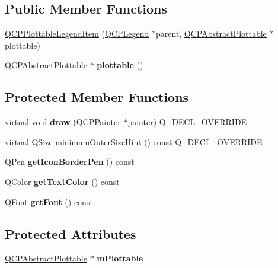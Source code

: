 \subsection*{Public Member Functions}
\begin{DoxyCompactItemize}
\item 
\hyperlink{classQCPPlottableLegendItem_ac1072591fe409d3dabad51b23ee4d6c5}{Q\+C\+P\+Plottable\+Legend\+Item} (\hyperlink{classQCPLegend}{Q\+C\+P\+Legend} $\ast$parent, \hyperlink{classQCPAbstractPlottable}{Q\+C\+P\+Abstract\+Plottable} $\ast$plottable)
\item 
\mbox{\label{classQCPPlottableLegendItem_af29e9a2c60b4cba0cac2447b8af7b488}} 
\hyperlink{classQCPAbstractPlottable}{Q\+C\+P\+Abstract\+Plottable} $\ast$ {\bfseries plottable} ()
\end{DoxyCompactItemize}
\subsection*{Protected Member Functions}
\begin{DoxyCompactItemize}
\item 
\mbox{\label{classQCPPlottableLegendItem_a5838366619200e99680afa6d355d13fa}} 
virtual void {\bfseries draw} (\hyperlink{classQCPPainter}{Q\+C\+P\+Painter} $\ast$painter) Q\+\_\+\+D\+E\+C\+L\+\_\+\+O\+V\+E\+R\+R\+I\+DE
\item 
virtual Q\+Size \hyperlink{classQCPPlottableLegendItem_a8b543f3ac32b2fe59326e01c1101b3b8}{minimum\+Outer\+Size\+Hint} () const Q\+\_\+\+D\+E\+C\+L\+\_\+\+O\+V\+E\+R\+R\+I\+DE
\item 
\mbox{\label{classQCPPlottableLegendItem_afa81a8bd4434ec249efbbfc2a030a752}} 
Q\+Pen {\bfseries get\+Icon\+Border\+Pen} () const
\item 
\mbox{\label{classQCPPlottableLegendItem_a55daaffee35326765deebf8271efe210}} 
Q\+Color {\bfseries get\+Text\+Color} () const
\item 
\mbox{\label{classQCPPlottableLegendItem_a77d980f594046226f9ac075fa07244b3}} 
Q\+Font {\bfseries get\+Font} () const
\end{DoxyCompactItemize}
\subsection*{Protected Attributes}
\begin{DoxyCompactItemize}
\item 
\mbox{\label{classQCPPlottableLegendItem_ada647fb4b22971a1a424e15b4f6af0d9}} 
\hyperlink{classQCPAbstractPlottable}{Q\+C\+P\+Abstract\+Plottable} $\ast$ {\bfseries m\+Plottable}
\end{DoxyCompactItemize}
